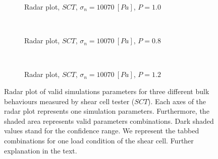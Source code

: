 \begin{figure}[htp] \centering
    \begin{subfigure}
        \texttt{[image: images/original/24radarpirker1schulze10070]}
        \caption{Radar plot, $SCT$, $\sigma_n=10070 ~[Pa]$, $P=1.0$}
        \label{fig:24radarpirker1schulze10070}
    \end{subfigure} \\
        \begin{subfigure}
        \texttt{[image: images/original/26radarpirker08schulze10070]}
        \caption{Radar plot, $SCT$, $\sigma_n=10070 ~[Pa]$, $P=0.8$}
        \label{fig:26radarpirker08schulze10070} 
    \end{subfigure}\\
        \begin{subfigure}
        \texttt{[image: images/original/28radarpirker12schulze10070]}
        \caption{Radar plot, $SCT$, $\sigma_n=10070 ~[Pa]$, $P=1.2$}
        \label{fig:28radarpirker12schulze10070} 
    \end{subfigure}
    \caption[Radar plot of valid simulations parameters for three different
    bulk behaviours measured by SCT]{Radar plot of valid simulations parameters for three different
    bulk behaviours measured by shear cell tester ($SCT$).
    Each axes of the radar plot represents one simulation parameters.
    Furthermore, the shaded area represents valid parameters combinations.
    Dark shaded values stand for the confidence range.
    We represent the tabbed combinations for one load condition of the shear cell. 
    Further explanation in the text.
   }
    \label{fig:29schulzeradarandcloud}
\end{figure}
% 
